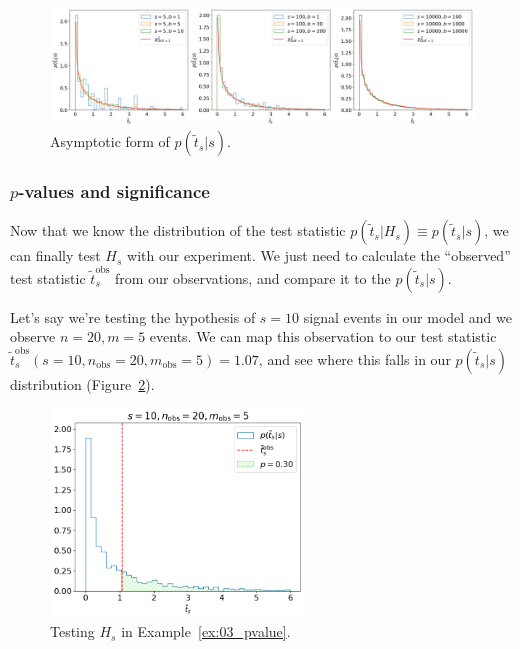 \begin{figure}[htb]
\centering
\includegraphics[width=\textwidth]{figures/03-Stats/02-hypothesis-testing/2.png}
\captionsetup{justification=centering}
\caption{Asymptotic form of $p(\tilde{t}_s|s)$.}
\label{fig:03_p_tilde_t_asym}
\end{figure}

\subsubsection{\texorpdfstring{$p$-values}{p-values} and significance}
\label{sec:03_significance}

Now that we know the distribution of the test statistic $p(\tilde{t}_s|H_s) \equiv p(\tilde{t}_s|s)$, we can finally test $H_s$ with our experiment.
We just need to calculate the ``observed'' test statistic $\tilde{t}^\mathrm{obs}_s$ from our observations, and compare it to the $p(\tilde{t}_s|s)$.

\begin{example}
\label{ex:03_pvalue}
Let's say we're testing the hypothesis of $s = 10$ signal events in our model and we observe $n = 20, m = 5$ events.
We can map this observation to our test statistic $\tilde{{t}}^\mathrm{{obs}}_s(s = 10, n_\mathrm{obs} = 20, m_\mathrm{obs} = 5) = 1.07$,
and see where this falls in our $p(\tilde{t}_s|s)$ distribution (Figure~\ref{fig:03_Hs}).
\end{example}

\begin{figure}[htb]
\centering
\includegraphics[width=0.6\textwidth]{figures/03-Stats/02-hypothesis-testing/3.png}
\captionsetup{justification=centering}
\caption{Testing $H_s$ in Example~\ref{ex:03_pvalue}.}
\label{fig:03_Hs}
\end{figure}

